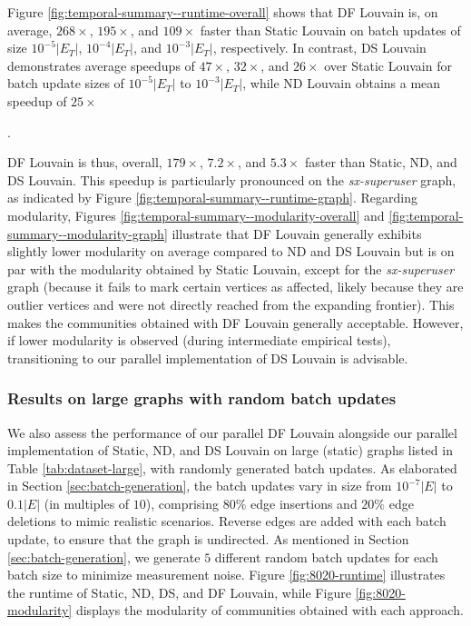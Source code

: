 Figure \ref{fig:temporal-summary--runtime-overall} shows that DF Louvain is, on average, $268\times$, $195\times$, and $109\times$ faster than Static Louvain on batch updates of size $10^{-5}|E_T|$, $10^{-4}|E_T|$, and $10^{-3}|E_T|$, respectively. In contrast, DS Louvain demonstrates average speedups of $47\times$, $32\times$, and $26\times$ over Static Louvain for batch update sizes of $10^{-5}|E_T|$ to $10^{-3}|E_T|$, while ND Louvain obtains a mean speedup of $25\times$. DF Louvain is thus, overall, $179\times$, $7.2\times$, and $5.3\times$ faster than Static, ND, and DS Louvain. This speedup is particularly pronounced on the \textit{sx-superuser} graph, as indicated by Figure \ref{fig:temporal-summary--runtime-graph}. Regarding modularity, Figures \ref{fig:temporal-summary--modularity-overall} and \ref{fig:temporal-summary--modularity-graph} illustrate that DF Louvain generally exhibits slightly lower modularity on average compared to ND and DS Louvain but is on par with the modularity obtained by Static Louvain, except for the \textit{sx-superuser} graph (because it fails to mark certain vertices as affected, likely because they are outlier vertices and were not directly reached from the expanding frontier). This makes the communities obtained with DF Louvain generally acceptable. However, if lower modularity is observed (during intermediate empirical tests), transitioning to our parallel implementation of DS Louvain is advisable.


\subsubsection{Results on large graphs with random batch updates}

We also assess the performance of our parallel DF Louvain alongside our parallel implementation of Static, ND, and DS Louvain on large (static) graphs listed in Table \ref{tab:dataset-large}, with randomly generated batch updates. As elaborated in Section \ref{sec:batch-generation}, the batch updates vary in size from $10^{-7}|E|$ to $0.1|E|$ (in multiples of $10$), comprising $80\%$ edge insertions and $20\%$ edge deletions to mimic realistic scenarios. Reverse edges are added with each batch update, to ensure that the graph is undirected. As mentioned in Section \ref{sec:batch-generation}, we generate $5$ different random batch updates for each batch size to minimize measurement noise. Figure \ref{fig:8020-runtime} illustrates the runtime of Static, ND, DS, and DF Louvain, while Figure \ref{fig:8020-modularity} displays the modularity of communities obtained with each approach.

